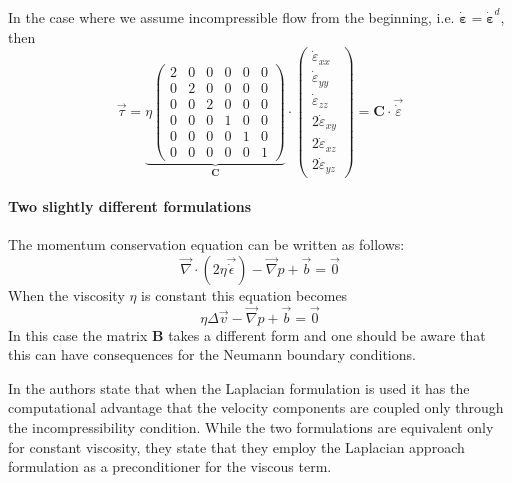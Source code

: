 In the case where we assume incompressible flow from the beginning, i.e. $\dot{\bm \varepsilon}=\dot{\bm \varepsilon}^d$, 
then 
\begin{equation}
\vec \tau  
=
\underbrace{
\eta
\left(
\begin{array}{cccccc}
2 & 0& 0& 0& 0& 0\\
0 & 2& 0& 0& 0& 0\\
0 & 0& 2& 0& 0& 0\\
0 &0 &0 & 1& 0& 0\\
0 &0 &0 & 0& 1& 0\\
0 &0 &0 & 0& 0& 1 
\end{array}
\right)
}_{\bm C}
\cdot
\left(
\begin{array}{c}
\dot\varepsilon_{xx} \\
\dot\varepsilon_{yy} \\
\dot\varepsilon_{zz} \\
2\dot\varepsilon_{xy} \\
2\dot\varepsilon_{xz} \\
2\dot\varepsilon_{yz} 
\end{array}
\right)
=
{\bm C} \cdot \vec{\dot \varepsilon}
\end{equation}

\paragraph{Two slightly different formulations}

The momentum conservation equation can be written as follows:
\[
\vec\nabla\cdot( 2 \eta \vec{\dot\epsilon}) - \vec\nabla p + \vec b = \vec 0
\]
When the viscosity $\eta$ is constant this equation becomes
\[
\eta \Delta \vec v - \vec\nabla p + \vec b = \vec 0
\]
In this case the matrix ${\bm B}$ takes a different form \cite[Eq. 6.24]{dohu03}
and one should be aware that this can have consequences for the Neumann boundary conditions. 

In \cite{bugs09} the authors state that when the Laplacian formulation is used 
it has the computational advantage that the velocity
components are coupled only through the incompressibility condition. 
While the two formulations are equivalent only for constant viscosity, they state 
that they employ the Laplacian approach formulation as a preconditioner for the viscous term. 

